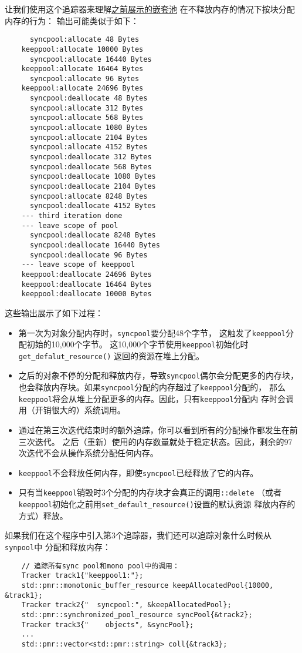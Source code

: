 让我们使用这个追踪器来理解\hyperref[嵌套池]{之前展示的嵌套池}
在不释放内存的情况下按块分配内存的行为：\label{追踪嵌套池的allocation}
输出可能类似于如下：
\begin{lstlisting}
      syncpool:allocate 48 Bytes
    keeppool:allocate 10000 Bytes
      syncpool:allocate 16440 Bytes
    keeppool:allocate 16464 Bytes
      syncpool:allocate 96 Bytes
    keeppool:allocate 24696 Bytes
      syncpool:deallocate 48 Bytes
      syncpool:allocate 312 Bytes
      syncpool:allocate 568 Bytes
      syncpool:allocate 1080 Bytes
      syncpool:allocate 2104 Bytes
      syncpool:allocate 4152 Bytes
      syncpool:deallocate 312 Bytes
      syncpool:deallocate 568 Bytes
      syncpool:deallocate 1080 Bytes
      syncpool:deallocate 2104 Bytes
      syncpool:allocate 8248 Bytes
      syncpool:deallocate 4152 Bytes
    --- third iteration done
    --- leave scope of pool
      syncpool:deallocate 8248 Bytes
      syncpool:deallocate 16440 Bytes
      syncpool:deallocate 96 Bytes
    --- leave scope of keeppool
    keeppool:deallocate 24696 Bytes
    keeppool:deallocate 16464 Bytes
    keeppool:deallocate 10000 Bytes
\end{lstlisting}
这些输出展示了如下过程：
\begin{itemize}
    \item 第一次为对象分配内存时，\texttt{syncpool}要分配48个字节，
    这触发了\texttt{keeppool}分配初始的10,000个字节。
    这10,000个字节使用\texttt{keeppool}初始化时\texttt{get\_defalut\_resource()}
    返回的资源在堆上分配。
    \item 之后的对象不停的分配和释放内存，导致\texttt{syncpool}偶尔会分配更多的内存块，
    也会释放内存块。如果\texttt{syncpool}分配的内存超过了\texttt{keeppool}分配的，
    那么\texttt{keeppool}将会从堆上分配更多的内存。因此，只有\texttt{keeppool}分配内
    存时会调用（开销很大的）系统调用。
    \item 通过在第三次迭代结束时的额外追踪，你可以看到所有的分配操作都发生在前三次迭代。
    之后（重新）使用的内存数量就处于稳定状态。因此，剩余的97次迭代不会从操作系统分配任何内存。
    \item \texttt{keeppool}不会释放任何内存，即使\texttt{syncpool}已经释放了它的内存。
    \item 只有当\texttt{keeppool}销毁时3个分配的内存块才会真正的调用\texttt{::delete}
    （或者\texttt{keeppool}初始化之前用\texttt{set\_default\_resource()}设置的默认资源
    释放内存的方式）释放。
\end{itemize}
如果我们在这个程序中引入第3个追踪器，我们还可以追踪对象什么时候从\texttt{synpool}中
分配和释放内存：
\begin{lstlisting}
    // 追踪所有sync pool和mono pool中的调用：
    Tracker track1{"keeppool1:"};
    std::pmr::monotonic_buffer_resource keepAllocatedPool{10000, &track1};
    Tracker track2{"  syncpool:", &keepAllocatedPool};
    std::pmr::synchronized_pool_resource syncPool{&track2};
    Tracker track3{"    objects", &syncPool};
    ...
    std::pmr::vector<std::pmr::string> coll{&track3};
\end{lstlisting}

